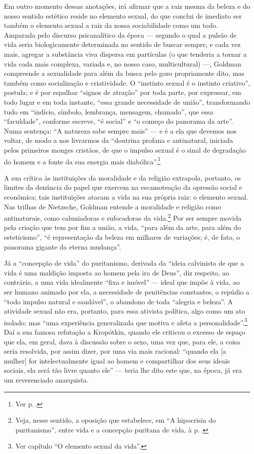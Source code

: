 Em outro momento dessas anotações, irá afirmar que a raiz mesma da beleza e do nosso
sentido estético reside no elemento sexual, do que conclui de imediato
ser também o elemento sexual a raiz da nossa sociabilidade como um todo.
Amparada pelo discurso psicanalítico da época --- segundo o qual a pulsão
de vida seria biologicamente determinada no sentido de buscar sempre, e
cada vez mais, agregar a substância viva dispersa em partículas (o que
tenderia a tornar a vida cada mais complexa, variada e, no nosso caso,
multicultural) ---, Goldman compreende a sexualidade para além da busca
pelo gozo propriamente dito, mas também como socialização e criatividade. O
``instinto sexual é o instinto criativo'', postula; e é por espalhar
``signos de atração'' por toda parte, por expressar, em todo lugar e em
toda instante, ``essa grande necessidade de união'', transformando tudo
em ``indício, símbolo, lembrança, mensagem, chamado'', que essa
``faculdade'', conforme escreve, ``é social'' e ``o começo do panorama
da arte''. Numa sentença: ``A natureza sabe sempre mais'' --- e é a ela
que devemos nos voltar, de modo a nos livrarmos da ``doutrina profana e
antinatural, iniciada pelos primeiros monges cristãos, de que o impulso
sexual é o sinal de degradação do homem e a fonte da sua energia mais
diabólica''.\footnote{Ver p.\,\pageref{diabolica}.}

A sua crítica às instituições da moralidade e da religião extrapola,
portanto, os limites da denúncia do papel que exercem na escamoteação da
opressão social e econômica; tais instituições atacam a vida na sua
própria raiz: o elemento sexual. Nas trilhas de Nietzsche, Goldman
entende a moralidade e religião como antinaturais, como
caluniadoras e sufocadoras da vida.\footnote{Veja, nesse sentido, a oposição que
estabelece, em ``A hipocrisia do puritanismo'', entre vida e a concepção
puritana de vida, à p.\,\pageref{hipocrisia}.} Por ser sempre movida pela criação que tem por fim a
união, a vida, ``para além da arte, para além do esteticismo'',
``é representação da beleza em milhares de variações; é, de fato, o
panorama gigante da eterna mudança''.

Já a ``concepção de vida'' do
puritanismo, derivada da ``ideia calvinista de que a vida é uma maldição
imposta ao homem pela ira de Deus'', diz respeito, ao contrário, a uma
vida idealmente ``fixa e imóvel'' --- ideal que impõe à vida, ao
ser humano animado por ela, a necessidade de penitências constantes, o
repúdio a ``todo impulso natural e saudável'', o abandono de toda
``alegria e beleza''. A atividade sexual não era, portanto, para
essa ativista política, algo como um ato isolado; mas ``uma
experiência generalizada que motiva e afeta a personalidade''.\footnote{Ver capítulo ``O
elemento sexual da vida''.} Daí a sua famosa refutação a Kropótkin,
quando ele criticou o excesso de espaço que ela, em geral, dava à
discussão sobre o sexo, uma vez que, para ele, a coisa seria resolvida,
por assim dizer, por uma via mais racional: ``quando ela {[}a mulher{]}
for intelectualmente igual ao homem e compartilhar dos seus ideais
sociais, ela será tão livre quanto ele'' --- teria lhe dito este que, na
época, já era um reverenciado anarquista.

